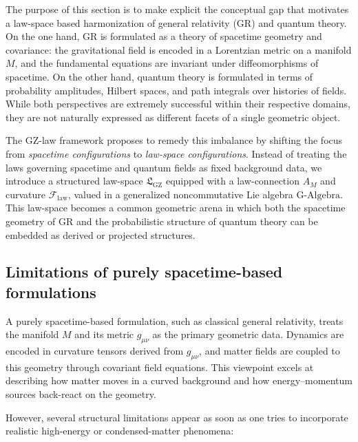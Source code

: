 \documentclass[11pt]{book}
\newcommand{\GAlgebra}{\text{G-Algebra}}
\newcommand{\GZLS}{\ensuremath{\mathfrak{L}_{\mathrm{GZ}}}}
\newcommand{\GZLOC}{\ensuremath{A_M}}
\newcommand{\GZLCurv}{\ensuremath{\mathcal{F}_{\mathrm{law}}}}
\newcommand{\Base}{\ensuremath{M}}
\theoremstyle{plain}
\theoremstyle{definition}
\theoremstyle{remark}
\begin{document}
The purpose of this section is to make explicit the conceptual gap
that motivates a law-space based harmonization of general relativity
(GR) and quantum theory. On the one hand, GR is formulated as a
theory of spacetime geometry and covariance: the gravitational field
is encoded in a Lorentzian metric on a manifold $\Base$, and the
fundamental equations are invariant under diffeomorphisms of
spacetime. On the other hand, quantum theory is formulated in terms
of probability amplitudes, Hilbert spaces, and path integrals over
histories of fields. While both perspectives are extremely
successful within their respective domains, they are not naturally
expressed as different facets of a single geometric object.

The GZ-law framework proposes to remedy this imbalance by shifting
the focus from \emph{spacetime configurations} to \emph{law-space
configurations}. Instead of treating the laws governing spacetime
and quantum fields as fixed background data, we introduce a
structured law-space $\GZLS$ equipped with a law-connection
$\GZLOC$ and curvature $\GZLCurv$, valued in a generalized
noncommutative Lie algebra $\GAlgebra$. This law-space becomes a
common geometric arena in which both the spacetime geometry of GR
and the probabilistic structure of quantum theory can be embedded
as derived or projected structures.

\subsection{Limitations of purely spacetime-based formulations}
\label{subsec:limit-spacetime}



A purely spacetime-based formulation, such as classical general
relativity, treats the manifold $\Base$ and its metric $g_{\mu\nu}$
as the primary geometric data. Dynamics are encoded in curvature
tensors derived from $g_{\mu\nu}$, and matter fields are coupled to
this geometry through covariant field equations. This viewpoint
excels at describing how matter moves in a curved background and how
energy--momentum sources back-react on the geometry.

However, several structural limitations appear as soon as one tries
to incorporate realistic high-energy or condensed-matter phenomena:
\end{document}
